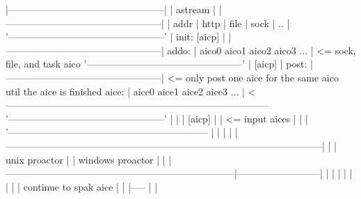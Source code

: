 \begin{DoxyPre}
      |------------------------------------------------|
      |                   astream                      |
      |------------------------------------------------|
      |  addr  | http | file | sock |      ..          | 
      '------------------------------------------------'
                            |
init:                    [aicp]
                            |
      |------------------------------------------------|
addo: | aico0   aico1   aico2   aico3      ...         | <= sock, file, and task aico
      '------------------------------------------------'
                            | 
                         [aicp]
                            |
post: |------------------------------------------------| <= only post one aice for the same aico util the aice is finished
aice: | aice0   aice1   aice2   aice3      ...         | <---------------------------------------------------------------------------------
      '------------------------------------------------'                                                                                  |
                            |                                                                                                             |
                         [aicp]                                                                                                           |
                            |         <= input aices                                                                                      |
                            |                                                                                                             |
                            '--------------------------------------------------------------                                               | 
                                                               |                          |                                               |
      |--------------------------------------------------------------------------------------------------|                                |
      |                         unix proactor                  |              |     windows proactor     |                                |
      |-----------------------------------------------------------------------|--------------------------|                                |
      |                                                        |              |           |              |                                |
      |                           continue to spak aice        |              |           |-----         |                                |

\end{DoxyPre}
